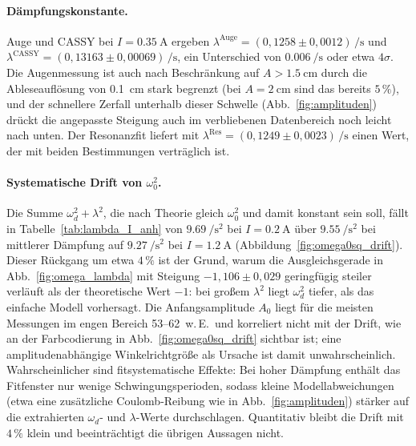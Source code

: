 \documentclass[11pt,a4paper]{article}
\begin{document}
\begin{table}[H]
\centering
\caption{Übersicht aller Bestimmungen der Eigenfrequenz und der
Dämpfungskonstante bei $I=\SI{0,35}{\ampere}$.}
\label{tab:vergleich}

\end{table}

\paragraph{Dämpfungskonstante.}
Auge und CASSY bei $I=\SI{0,35}{\ampere}$ ergeben
$\lambda^{\mathrm{Auge}}=(0{,}1258\pm 0{,}0012)\,\si{\per\second}$
und
$\lambda^{\mathrm{CASSY}}=(0{,}13163\pm 0{,}00069)\,\si{\per\second}$,
ein Unterschied von $\SI{0,006}{\per\second}$ oder etwa $4\sigma$.
Die Augenmessung ist auch nach Beschränkung auf
$A>\SI{1,5}{\centi\metre}$ durch die Ableseauflösung von
\SI{0,1}{\centi\metre} stark begrenzt (bei $A=\SI{2}{\centi\metre}$
sind das bereits $5\,\%$), und der schnellere Zerfall unterhalb
dieser Schwelle (Abb.~\ref{fig:amplituden}) drückt die angepasste
Steigung auch im verbliebenen Datenbereich noch leicht nach unten.
Der Resonanzfit liefert mit
$\lambda^{\mathrm{Res}}=(0{,}1249\pm 0{,}0023)\,\si{\per\second}$
einen Wert, der mit beiden Bestimmungen verträglich ist.

\paragraph{Systematische Drift von $\omega_0^2$.}
Die Summe $\omega_d^2+\lambda^2$, die nach Theorie gleich
$\omega_0^2$ und damit konstant sein soll, fällt in
Tabelle~\ref{tab:lambda_I_anh} von
$\SI{9,69}{\per\square\second}$ bei $I=\SI{0,2}{\ampere}$ über
$\SI{9,55}{\per\square\second}$ bei mittlerer Dämpfung auf
$\SI{9,27}{\per\square\second}$ bei $I=\SI{1,2}{\ampere}$
(Abbildung~\ref{fig:omega0sq_drift}). Dieser Rückgang um etwa
$4\,\%$ ist der Grund, warum die Ausgleichsgerade in
Abb.~\ref{fig:omega_lambda} mit Steigung $-1{,}106\pm 0{,}029$
geringfügig steiler verläuft als der theoretische Wert $-1$: bei
großem $\lambda^2$ liegt $\omega_d^2$ tiefer, als das einfache
Modell vorhersagt. Die Anfangsamplitude $A_0$ liegt für die
meisten Messungen im engen Bereich \numrange{53}{62}~w.\,E.\ und
korreliert nicht mit der Drift, wie an der Farbcodierung in
Abb.~\ref{fig:omega0sq_drift} sichtbar ist; eine
amplitudenabhängige Winkelrichtgröße als Ursache ist damit
unwahrscheinlich. Wahrscheinlicher sind fitsystematische Effekte:
Bei hoher Dämpfung enthält das Fitfenster nur wenige
Schwingungsperioden, sodass kleine Modellabweichungen (etwa eine
zusätzliche Coulomb-Reibung wie in Abb.~\ref{fig:amplituden})
stärker auf die extrahierten $\omega_d$- und $\lambda$-Werte
durchschlagen. Quantitativ bleibt die Drift mit $4\,\%$ klein und
beeinträchtigt die übrigen Aussagen nicht.
\end{document}
